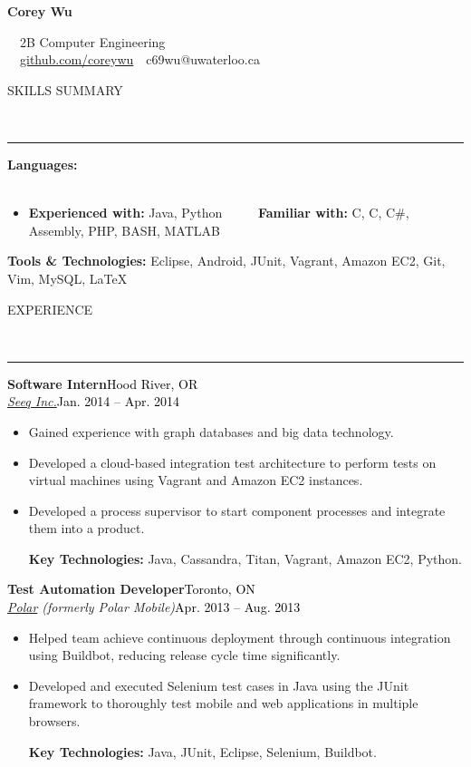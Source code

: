 \documentclass[11pt, letterpaper, oneside]{article}
\makeatletter
\newcommand{\name}{Corey Wu}
\newcommand{\program}{2B Computer Engineering}
\newcommand{\github}{\href{https://github.com/coreywu}{github.com/coreywu}}
\newcommand{\email}{c69wu@uwaterloo.ca}
\newcommand{\HRule}[2]{\textcolor{#1}{\rule{\linewidth}{#2}}}
\newcommand{\sectiontitle}[1]{\begin{minipage}{\textwidth}\vspace{-7.5pt}\begin{flushleft}\hspace{-20.5pt}\vspace{-25pt}
\Large\MakeUppercase{#1}\end{flushleft}\end{minipage}\\\HRule{black}{0.15mm}\vspace{\baselineskip}}
\newenvironment{ressection}[1]{
  \sectiontitle{#1}}
  {\vspace{-\baselineskip}}
\newcommand{\resentryheader}[4]{
    \vspace{-6pt}
    \textbf{#1}\hspace{\stretch{1}}\textcolor{black}{#3}\\
    \textit{#2}\hspace{\stretch{1}}\textcolor{black}{#4}\\
}
\newcommand{\resitem}[1]{
    \vspace{2pt}
    \item \begin{flushleft} #1 \end{flushleft}
}
\newcommand{\CPP}
{C\nolinebreak[4]\hspace{-.05em}\raisebox{.22ex}{\footnotesize\bf ++}}
\newenvironment{resentry}[4]{
  \begin{minipage}{\textwidth}
  \vspace{-3pt}
    \resentryheader{#1}{#2}{#3}{#4}
        \vspace{-\baselineskip}
    \begin{itemize}[noitemsep,nolistsep]
}{
    \end{itemize}
        \vspace{\baselineskip}
        \end{minipage}
}
\makeatother
\begin{document}
\begin{center}
	{\Huge \textbf{\name}}

	\ \ {\Large{\program}} \\
	\ \ \github \ \textbullet \ \email \ \
\end{center}

\vspace{-20pt}

\begin{ressection}{Skills Summary}
\begin{resentry}{Languages:}{}{}{}{}
\vspace{-16pt}
\resitem{\textbf{Experienced with:} Java, Python \ \ \ \ \textbullet \ \textbf{Familiar with:} C, \CPP, C\#, Assembly, PHP, BASH, MATLAB}
\vspace{-10pt}
\end{resentry}
\textbf{Tools \& Technologies:} Eclipse, Android, JUnit, Vagrant, Amazon EC2, Git, Vim, MySQL, \LaTeX
\end{ressection}
\vspace{14pt}

\begin{ressection}{Experience}
  \begin{resentry}{Software Intern}{\href{http://www.seeq.com/}{Seeq Inc.}}{Hood River, OR}{Jan. 2014 -- Apr. 2014}
    \resitem{Gained experience with graph databases and big data technology.}
    \resitem{Developed a cloud-based integration test architecture to perform tests on virtual machines using Vagrant and Amazon EC2 instances.}
    \resitem{Developed a process supervisor to start component processes and integrate them into a product. }
    \vspace{4pt} \hspace{-15pt}
    \textbf{Key Technologies:} Java, Cassandra, Titan, Vagrant, Amazon EC2, Python.
  \end{resentry}
  \begin{resentry}{Test Automation Developer}{\href{http://polar.me/}{Polar} (formerly Polar Mobile)}{Toronto, ON}{Apr. 2013 -- Aug. 2013}
    \resitem{Helped team achieve continuous deployment through continuous integration using Buildbot, reducing release cycle time significantly.}
    \resitem{Developed and executed Selenium test cases in Java using the JUnit framework to thoroughly test mobile and web applications in multiple browsers.}
    \vspace{4pt} \hspace{-15pt}
    \textbf{Key Technologies:} Java, JUnit, Eclipse, Selenium, Buildbot.
  \end{resentry}
\end{ressection}
\end{document}
